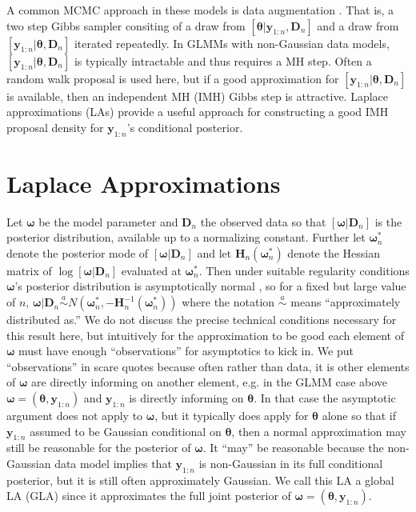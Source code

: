 \documentclass[12pt]{article}
\begin{document}
A common MCMC approach in these models is data augmentation \citep[DA;][]{tanner1987calculation}. That is, a two step Gibbs sampler consiting of a draw from $[\bm{\theta}|\bm{y}_{1:n},\bm{D}_n]$ and a draw from $[\bm{y}_{1:n}|\bm{\theta},\bm{D}_n]$ iterated repeatedly. In GLMMs with non-Gaussian data models, $[\bm{y}_{1:n}|\bm{\theta},\bm{D}_n]$ is typically intractable and thus requires a MH step. Often a random walk proposal is used here, but if a good approximation for $[\bm{y}_{1:n}|\bm{\theta}, \bm{D}_n]$ is available, then an independent MH (IMH) Gibbs step is attractive. Laplace approximations (LAs) provide a useful approach for constructing a good IMH proposal density for $\bm{y}_{1:n}$'s conditional posterior.


\section{Laplace Approximations}\label{sec:laplace}
Let $\bm{\omega}$ be the model parameter and $\bm{D}_n$ the observed data so that $[\bm{\omega}|\bm{D}_{n}]$ is the posterior distribution, available up to a normalizing constant. Further let $\bm{\omega}^*_n$ denote the posterior mode of $[\bm{\omega}|\bm{D}_{n}]$ and let $\bm{H}_n(\bm{\omega}^*_n)$ denote the Hessian matrix of $\log [\bm{\omega}|\bm{D}_{n}]$ evaluated at $\bm{\omega}_n^*$. Then under suitable regularity conditions $\bm{\omega}$'s posterior distribution is asymptotically normal \citep[Sections~7.4.2~and~7.4.3]{schervish1997theory}, so for a fixed but large value of $n$, $\bm{\omega}|\bm{D}_{n} \stackrel{a}{\sim} N(\bm{\omega}_n^*, -\bm{H}_n^{-1}(\bm{\omega}^*_n))$ where the notation $\stackrel{a}{\sim}$ means ``approximately distributed as.'' We do not discuss the precise technical conditions necessary for this result here, but intuitively for the approximation to be good each element of $\bm{\omega}$ must have enough ``observations'' for asymptotics to kick in. We put ``observations'' in scare quotes because often rather than data, it is other elements of $\bm{\omega}$ are directly informing on another element, e.g. in the GLMM case above $\bm{\omega} = (\bm{\theta}, \bm{y}_{1:n})$ and $\bm{y}_{1:n}$ is directly informing on $\bm{\theta}$. In that case the asymptotic argument does not apply to $\bm{\omega}$, but it typically does apply for $\bm{\theta}$ alone so that if $\bm{y}_{1:n}$ assumed to be Gaussian conditional on $\bm{\theta}$, then a normal approximation may still be reasonable for the posterior of $\bm{\omega}$. It ``may'' be reasonable because the non-Gaussian data model implies that $\bm{y}_{1:n}$ is non-Gaussian in its full conditional posterior, but it is still often approximately Gaussian. We call this LA a global LA (GLA) since it approximates the full joint posterior of $\bm{\omega}=(\bm{\theta},\bm{y}_{1:n})$. 
\end{document}
